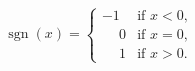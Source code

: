 \documentclass{article}
\begin{document}
\[
  \operatorname{sgn}(x) =
  \begin{cases}
    -1 & \text{if } x < 0, \\
    \phantom{-}0 & \text{if } x = 0, \\
    \phantom{-}1 & \text{if } x > 0.
  \end{cases}
\]
\end{document}
